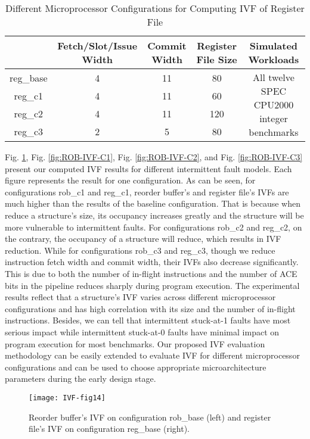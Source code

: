 \begin{table}
    \caption{Different Microprocessor Configurations for Computing IVF of Register File}
    \begin{tabular}{c|cccc}
        \hline
         & Fetch/Slot/Issue Width & Commit Width & Register File Size & Simulated Workloads \\ \hline
         reg\_base & 4 & 11 & 80 & \multirow{4}{*}{All twelve SPEC CPU2000 integer benchmarks} \\
         reg\_c1 & 4 & 11 & 60 &  \\
         reg\_c2 & 4 & 11 & 120 & \\
         reg\_c3 & 2 & 5 & 80 & \\ \hline
    \end{tabular}
    \label{tab:RF-config}
\end{table}


Fig. \ref{fig:ROB-IVF-base}, Fig. \ref{fig:ROB-IVF-C1}, Fig. \ref{fig:ROB-IVF-C2}, and Fig. \ref{fig:ROB-IVF-C3} present our computed IVF results for different intermittent fault models. Each figure represents the result for one configuration. As can be seen, for configurations rob\_c1 and reg\_c1, reorder buffer’s and register file’s IVFs are much higher than the results of the baseline configuration. That is because when reduce a structure’s size, its occupancy increases greatly and the structure will be more vulnerable to intermittent faults. For configurations rob\_c2 and reg\_c2, on the contrary, the occupancy of a structure will reduce, which results in IVF reduction. While for configurations rob\_c3 and reg\_c3, though we reduce instruction fetch width and commit width, their IVFs also decrease significantly. This is due to both the number of in-flight instructions and the number of ACE bits in the pipeline reduces sharply during program execution. The experimental results reflect that a structure’s IVF varies across different microprocessor configurations and has high correlation with its size and the number of in-flight instructions. Besides, we can tell that intermittent stuck-at-1 faults have most serious impact while intermittent stuck-at-0 faults have minimal impact on program execution for most benchmarks. Our proposed IVF evaluation methodology can be easily extended to evaluate IVF for different microprocessor configurations and can be used to choose appropriate microarchitecture parameters during the early design stage.

\begin{figure}[t]
    \centering
    \texttt{[image: IVF-fig14]}\\
    \caption{Reorder buffer's IVF on configuration rob\_base (left) and register file's IVF on configuration reg\_base (right).}
    \label{fig:ROB-IVF-base}
\end{figure}

